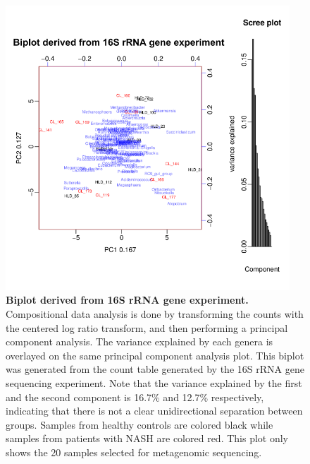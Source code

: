 \begin{figure}[h]
\begin{center}
\includegraphics[width=0.95\textwidth]{16S_metagenomic_biplot.png}
\caption[Biplot derived from 16S rRNA gene experiment.]{\textbf{Biplot derived from 16S rRNA gene experiment.} Compositional data analysis is done by transforming the counts with the centered log ratio transform, and then performing a principal component analysis. The variance explained by each genera is overlayed on the same principal component analysis plot. This biplot was generated from the count table generated by the 16S rRNA gene sequencing experiment. Note that the variance explained by the first and the second component is 16.7\% and 12.7\% respectively, indicating that there is not a clear unidirectional separation between groups. Samples from healthy controls are colored black while samples from patients with NASH are colored red. This plot only shows the 20 samples selected for metagenomic sequencing.}
\label{nafld_16s_metagenomic_biplot}
\end{center}
\end{figure}

